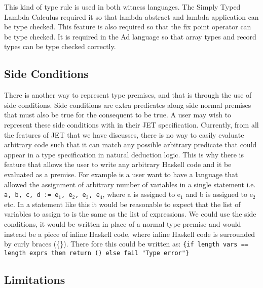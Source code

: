 This kind of type rule is used in both witness languages.
The Simply Typed Lambda Calculus required it so that lambda abstract and lambda application can be type checked.
This feature is also required so that the fix point operator can be type checked.
It is required in the Ad language so that array types and record types can be type checked correctly.


\subsection{Side Conditions}
There is another way to represent type premises, and that is through the use of side conditions.
Side conditions are extra predicates along side normal premises that must also be true for the consequent to be true.
A user may wish to represent these side conditions with in their JET specification.
Currently, from all the features of JET that we have discusses, there is no way to easily evaluate arbitrary code such that it can match any possible arbitrary predicate that could appear in a type specification in natural deduction logic.
This is why there is feature that allows the user to write any arbitrary Haskell code and it be evaluated as a premise.
For example is a user want to have a language that allowed the assignment of arbitrary number of variables in a single statement i.e. \texttt{a, b, c, d := e$_1$, e$_2$, e$_3$, e$_4$}, where a is assigned to e$_1$ and b is assigned to e$_2$ etc.
In a statement like this it would be reasonable to expect that the list of variables to assign to is the same as the list of expressions.
We could use the side conditions, it would be written in place of a normal type premise and would instead be a piece of inline Haskell code, where inline Haskell code is surrounded by curly braces (\{\}).
There fore this could be written as: \texttt{\{if length vars == length exprs then return () else fail "Type error"\}}

\subsection{Limitations}
